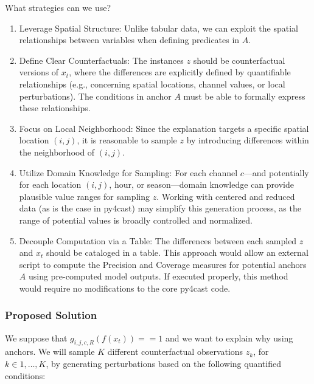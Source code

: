 What strategies can we use?
\begin{enumerate}
\item Leverage Spatial Structure: Unlike tabular data, we can exploit the spatial relationships between variables when defining predicates in $A$.
\item Define Clear Counterfactuals: The instances $z$ should be counterfactual versions of $x_t$, where the differences are explicitly defined by quantifiable relationships (e.g., concerning spatial locations, channel values, or local perturbations). The conditions in anchor $A$ must be able to formally express these relationships.
\item Focus on Local Neighborhood: Since the explanation targets a specific spatial location $(i, j)$, it is reasonable to sample $z$ by introducing differences within the neighborhood of $(i, j)$.
\item Utilize Domain Knowledge for Sampling: For each channel $c$—and potentially for each location $(i, j)$, hour, or season—domain knowledge can provide plausible value ranges for sampling $z$. Working with centered and reduced data (as is the case in py4cast) may simplify this generation process, as the range of potential values is broadly controlled and normalized.
\item Decouple Computation via a Table: The differences between each sampled $z$ and $x_t$ should be cataloged in a table. This approach would allow an external script to compute the Precision and Coverage measures for potential anchors $A$ using pre-computed model outputs. If executed properly, this method would require no modifications to the core py4cast code.
\end{enumerate}

\subsubsection{Proposed Solution}
We suppose that $g_{i,j,c,R}(f(x_t)) == 1$ and we want to explain why using anchors. We will sample $K$ different counterfactual observations ${z_k}$, for $k \in {1, \ldots , K}$, by generating perturbations based on the following quantified conditions:

